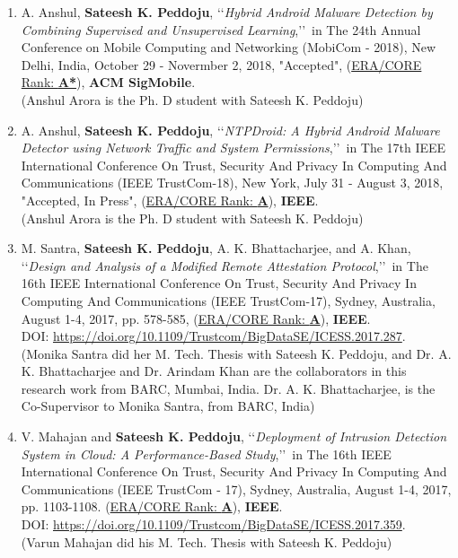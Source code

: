 \begin{enumerate}%

		\item
	A. Anshul, \textbf{Sateesh K. Peddoju}, \lq\lq \textit{Hybrid Android Malware Detection by Combining Supervised and Unsupervised Learning},\rq\rq\, in The 24th Annual Conference on Mobile Computing and Networking (MobiCom - 2018), New Delhi, India, October 29 - Novermber 2, 2018, "Accepted", (\underline{ERA/CORE Rank: \textbf{A*}}), \textbf{ACM SigMobile}. \\ (Anshul Arora is the Ph. D student with Sateesh K. Peddoju)

	
	\item
	A. Anshul, \textbf{Sateesh K. Peddoju}, \lq\lq \textit{NTPDroid: A Hybrid Android Malware Detector using Network Traffic and System Permissions},\rq\rq\, in The 17th IEEE International Conference On Trust, Security And Privacy In Computing And Communications (IEEE TrustCom-18), New York, July 31 - August 3, 2018, "Accepted, In Press", (\underline{ERA/CORE Rank: \textbf{A}}), \textbf{IEEE}. \\ (Anshul Arora is the Ph. D student with Sateesh K. Peddoju)
	
	\item
	M. Santra, \textbf{Sateesh K. Peddoju}, A. K. Bhattacharjee, and A. Khan, \lq\lq \textit{Design and Analysis of a Modified Remote Attestation Protocol},\rq\rq\, in The 16th IEEE International Conference On Trust, Security And Privacy In Computing And Communications (IEEE TrustCom-17), Sydney, Australia, August 1-4, 2017,  pp. 578-585, (\underline{ERA/CORE Rank: \textbf{A}}), \textbf{IEEE}. \\DOI: \url{https://doi.org/10.1109/Trustcom/BigDataSE/ICESS.2017.287}.	\\(Monika Santra did her M. Tech. Thesis with Sateesh K. Peddoju, and Dr. A. K. Bhattacharjee and Dr. Arindam Khan are the collaborators in this research work from BARC, Mumbai, India. Dr. A. K. Bhattacharjee, is the Co-Supervisor to Monika Santra, from BARC, India)

		
	\item
	V. Mahajan and \textbf{Sateesh K. Peddoju}, \lq\lq \textit{Deployment of Intrusion Detection System in Cloud: A Performance-Based Study},\rq\rq\,  in The 16th IEEE International Conference On Trust, Security And Privacy In Computing And Communications (IEEE TrustCom - 17), Sydney, Australia, August 1-4, 2017,  pp. 1103-1108. (\underline{ERA/CORE Rank: \textbf{A}}), \textbf{IEEE}. \\ DOI: \url{https://doi.org/10.1109/Trustcom/BigDataSE/ICESS.2017.359}. \\(Varun Mahajan did his M. Tech. Thesis with Sateesh K. Peddoju)


\end{enumerate}
